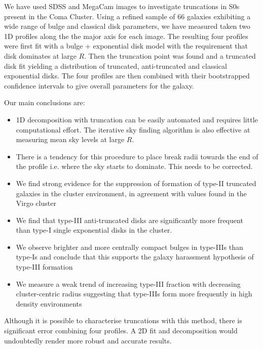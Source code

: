 
We have used SDSS and MegaCam \iband images to investigate truncations in S0s present in the Coma Cluster. Using a refined sample of 66 galaxies exhibiting a wide range of bulge and classical disk parameters, we have measured taken two 1D profiles along the the major axis for each image. The resulting four profiles were first fit with a \sersic bulge + exponential disk model with the requirement that disk dominates at large $R$. Then the truncation point was found and a truncated disk fit yielding a distribution of truncated, anti-truncated and classical exponential disks. The four profiles are then combined with their bootstrapped confidence intervals to give overall parameters for the galaxy.

Our main conclusions are:
\begin{itemize}
	\item 1D decomposition with truncation can be easily automated and requires little computational effort. The iterative sky finding algorithm is also effective at measuring mean sky levels at large $R$.
	\item There is a tendency for this procedure to place break radii towards the end of the profile i.e. where the sky starts to dominate. This needs to be corrected.
	\item We find strong evidence for the suppression of formation of type-II truncated galaxies in the cluster environment, in agreement with values found in the Virgo cluster \citep{erwin_strong_2012}
	\item We find that type-III anti-truncated disks are significantly more frequent than type-I single exponential disks in the cluster. 
	\item We observe brighter and more centrally compact bulges in type-IIIs than type-Is and conclude that this supports the galaxy harassment hypothesis of type-III formation
	\item We measure a weak trend of increasing type-III fraction with decreasing cluster-centric radius suggesting that type-IIIs form more frequently in high density environments
\end{itemize}

Although it is possible to characterise truncations with this method, there is significant error combining four profiles. A 2D fit and decomposition would undoubtedly render more robust and accurate results.